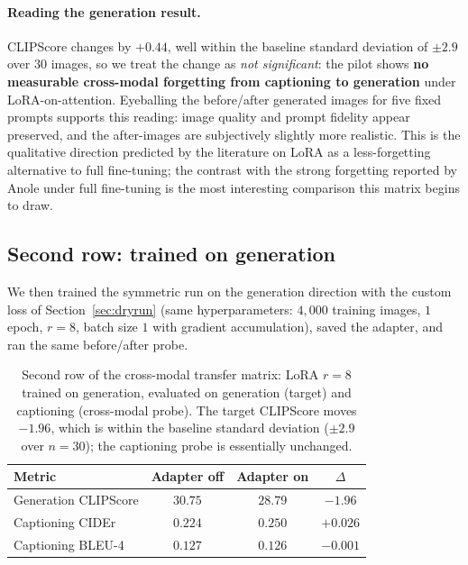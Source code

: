 \paragraph{Reading the generation result.} CLIPScore changes by $+0.44$,
well within the baseline standard deviation of $\pm 2.9$ over $30$ images,
so we treat the change as \emph{not significant}: the pilot shows
\textbf{no measurable cross-modal forgetting from captioning to generation}
under LoRA-on-attention. Eyeballing the before/after generated images for
five fixed prompts supports this reading: image quality and prompt fidelity
appear preserved, and the after-images are subjectively slightly more
realistic. This is the qualitative direction predicted by the literature on
LoRA as a less-forgetting alternative to full fine-tuning; the contrast with
the strong forgetting reported by Anole under full fine-tuning is the most
interesting comparison this matrix begins to draw.

\subsection{Second row: trained on generation}
\label{sec:row_generation}

We then trained the symmetric run on the generation direction with the
custom loss of Section~\ref{sec:dryrun} (same hyperparameters: $4{,}000$
training images, $1$ epoch, $r{=}8$, batch size $1$ with gradient
accumulation), saved the adapter, and ran the same before/after probe.

\begin{table}[h]
\centering
\small
\begin{tabular}{lccc}
\toprule
Metric & Adapter off & Adapter on & $\Delta$ \\
\midrule
Generation CLIPScore & $30.75$ & $28.79$ & $\mathbf{-1.96}$ \\
Captioning CIDEr     & $0.224$ & $0.250$ & $+0.026$ \\
Captioning BLEU-4    & $0.127$ & $0.126$ & $-0.001$ \\
\bottomrule
\end{tabular}
\caption{Second row of the cross-modal transfer matrix: LoRA $r{=}8$ trained
on generation, evaluated on generation (target) and captioning (cross-modal
probe). The target CLIPScore moves $-1.96$, which is within the baseline
standard deviation ($\pm 2.9$ over $n{=}30$); the captioning probe is
essentially unchanged.}
\label{tab:row_generation}
\end{table}

